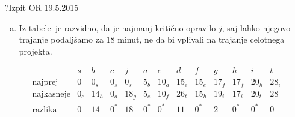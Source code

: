 \begin{naloga}{?}{Izpit OR 19.5.2015}
\begin{odgovor}
\begin{enumerate}[(a)]
\item Iz tabele~ je razvidno,
da je najmanj kritično opravilo $j$,
saj lahko njegovo trajanje podaljšamo za $18$ minut,
ne da bi vplivali na trajanje celotnega projekta.
\end{enumerate}
%
\begin{slika}
\makebox[\textwidth][c]{
\pgfslika
}
\end{slika}
%
\begin{tabela}
$$
\begin{array}{r|cccccccccccc}
& s & b & c & j & a & e & d & f & g & h & i & t \\ \hline
\text{najprej} &
0 & 0_s & 0_s & 0_s & 5_b & 10_a & 15_e & 15_e & 17_f & 17_f & 20_h & 28_i \\
\text{najkasneje} &
0_c & 14_h & 0_a & 18_g & 5_e & 10_f & 26_t & 15_h & 19_i & 17_i & 20_t & 28 \\
\text{razlika} &
0 & 14 & 0^* & 18 & 0^* & 0^* & 11 & 0^* & 2 & 0^* & 0^* & 0
\end{array}
$$
\end{tabela}
\end{odgovor}
\end{naloga}
